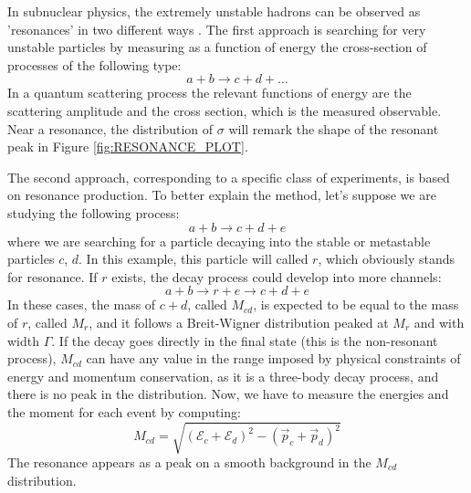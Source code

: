 In subnuclear physics, the extremely unstable hadrons can be observed as 'resonances' in two different ways \cite{bettini}. The first approach is searching for very unstable particles by measuring as a function of energy the cross-section of processes of the following type:
\begin{equation}
	a + b \rightarrow c + d + \dots
\end{equation}
In a quantum scattering process the relevant functions of energy are the scattering amplitude and the cross section, which is the measured observable. Near a resonance, the distribution of $\sigma$ will remark the shape of the resonant peak in Figure \ref{fig:RESONANCE_PLOT}.

The second approach, corresponding to a specific class of experiments, is based on resonance production. To better explain the method, let's suppose we are studying the following process:
\begin{equation}
	a + b \rightarrow c + d + e
\end{equation}
where we are searching for a particle decaying into the stable or metastable particles $c$, $d$. In this example, this particle will called $r$, which obviously stands for resonance. If $r$ exists, the decay process could develop into more channels:
\begin{equation}
	a + b \rightarrow r + e \rightarrow c + d + e
\end{equation}
In these cases, the mass of $c+d$, called $M_{cd}$, is expected to be equal to the mass of $r$, called $M_{r}$, and it follows a Breit-Wigner distribution peaked at $M_{r}$ and with width $\Gamma$. If the decay goes directly in the final state (this is the non-resonant process), $M_{cd}$ can have any value in the range imposed by physical constraints of energy and momentum conservation, as it is a three-body decay process, and there is no peak in the distribution. Now, we have to measure the energies and the moment for each event by computing:
\begin{equation}
	M_{cd} = \sqrt{(\mathcal{E}_{c} + \mathcal{E}_{d})^2 - (\vec{p}_{c} + \vec{p}_{d})^2}
\end{equation}
The resonance appears as a peak on a smooth background in the $M_{cd}$ distribution.

